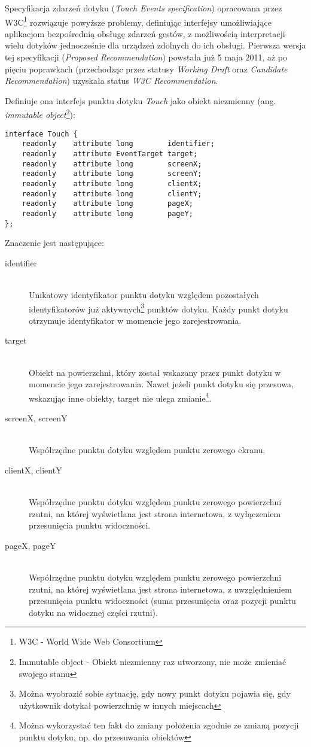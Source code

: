 Specyfikacja zdarzeń dotyku (\emph{Touch Events specification}\cite{touch-events-w3c}) opracowana przez W3C\footnote{W3C - World Wide Web Consortium} rozwiązuje powyższe problemy, definiując interfejsy umożliwiające aplikacjom bezpośrednią obsługę zdarzeń gestów, z możliwością interpretacji wielu dotyków jednocześnie dla urządzeń zdolnych do ich obsługi. Pierwsza wersja tej specyfikacji (\emph{Proposed Recommendation}) powstała już 5 maja 2011, aż po pięciu poprawkach (przechodząc przez statusy \emph{Working Draft} oraz \emph{Candidate Recommendation}) uzyskała status \emph{W3C Recommendation}.

Definiuje ona interfejs punktu dotyku \emph{Touch} jako obiekt niezmienny (ang. \emph{immutable object}\footnote{Immutable object - Obiekt niezmienny raz utworzony, nie może zmieniać swojego stanu}):

\lstset{language=Octave}
\begin{lstlisting}
interface Touch {
    readonly    attribute long        identifier;
    readonly    attribute EventTarget target;
    readonly    attribute long        screenX;
    readonly    attribute long        screenY;
    readonly    attribute long        clientX;
    readonly    attribute long        clientY;
    readonly    attribute long        pageX;
    readonly    attribute long        pageY;
};
\end{lstlisting}

Znaczenie jest następujące:

\begin{description}
  \item[identifier] \hfill \\
  Unikatowy identyfikator punktu dotyku względem pozostałych identyfikatorów już aktywnych\footnote{Można wyobrazić sobie sytuację, gdy nowy punkt dotyku pojawia się, gdy użytkownik dotykał powierzchnię w innych miejscach} punktów dotyku. Każdy punkt dotyku otrzymuje identyfikator w momencie jego zarejestrowania.
  \item[target] \hfill \\
  Obiekt na powierzchni, który został wskazany przez punkt dotyku w momencie jego zarejestrowania. Nawet jeżeli punkt dotyku się przesuwa, wskazując inne obiekty, target nie ulega zmianie\footnote{Można wykorzystać ten fakt do zmiany położenia zgodnie ze zmianą pozycji punktu dotyku, np. do przesuwania obiektów}.
  \item[screenX, screenY] \hfill \\
  Współrzędne punktu dotyku względem punktu zerowego ekranu.
  \item[clientX, clientY] \hfill \\
  Współrzędne punktu dotyku względem punktu zerowego powierzchni rzutni, na której wyświetlana jest strona internetowa, z wyłączeniem przesunięcia punktu widoczności.
  \item[pageX, pageY] \hfill \\
  Współrzędne punktu dotyku względem punktu zerowego powierzchni rzutni, na której wyświetlana jest strona internetowa, z uwzględnieniem przesunięcia punktu widoczności (suma przesunięcia oraz pozycji punktu dotyku na widocznej części rzutni).
\end{description}

